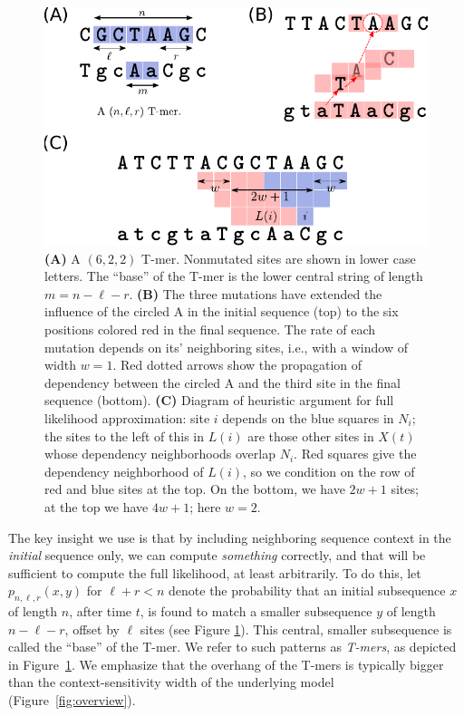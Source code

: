 \documentclass{article}
\newcommand{\nA}{\mbox{A}}  %
\theoremstyle{plain}
\theoremstyle{definition}
\begin{document}
\begin{figure}
    \begin{center}
        \includegraphics{Tmer-dependency}
    \end{center}
    \caption{
        \textbf{(A)} A $(6,2,2)$ T-mer.
        Nonmutated sites are shown in lower case letters.
        The ``base'' of the T-mer is the lower central
        string of length $m = n - \ell - r$.
        \textbf{(B)}
        The three mutations have extended the influence of the circled \nA{}
        in the initial sequence (top)
        to the six positions colored red in the final sequence.
        The rate of each mutation depends on its' neighboring sites,
        i.e., with a window of width $w=1$.
        Red dotted arrows show the propagation of dependency
        between the circled \nA{}
        and the third site in the final sequence (bottom).
        \textbf{(C)} Diagram of heuristic argument for full likelihood approximation:
        site $i$ depends on the blue squares in $N_i$;
        the sites to the left of this in $L(i)$ are those other sites in $X(t)$
        whose dependency neighborhoods overlap $N_i$.
        Red squares give the dependency neighborhood of $L(i)$,
        so we condition on the row of red and blue sites at the top.
        On the bottom, we have $2w+1$ sites; at the top we have $4w+1$;
        here $w=2$.
        \label{fig:Tmers}
    }
\end{figure}



The key insight we use is that by including neighboring sequence context in the \emph{initial} sequence only,
we can compute \emph{something} correctly,
and that will be sufficient to compute the full likelihood,
at least arbitrarily.
To do this, let $p_{n,\ell,r}(x,y)$ for $\ell + r < n$ denote
the probability that an initial subsequence $x$ of length $n$, after time $t$,
is found to match a smaller subsequence $y$ of length $n-\ell-r$, offset by $\ell$ sites
(see Figure \ref{fig:Tmers}).
This central, smaller subsequence is called the ``base'' of the T-mer.
We refer to such patterns as \emph{T-mers}, as depicted in Figure~\ref{fig:Tmers}.
We emphasize that the overhang of the T-mers is typically bigger than the
context-sensitivity width of the underlying model (Figure~\ref{fig:overview}).
\end{document}
